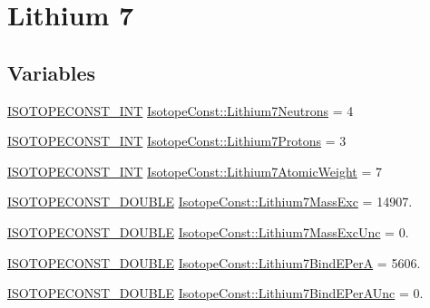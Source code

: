 \hypertarget{group___isotope_const-_lithium-_li7}{}\section{Lithium 7}
\label{group___isotope_const-_lithium-_li7}
\subsection*{Variables}
\begin{DoxyCompactItemize}
\item 
\mbox{\hyperlink{group___isotope_const-_macros_ga5f18360b3e99483a35c32d789e62621c}{I\+S\+O\+T\+O\+P\+E\+C\+O\+N\+S\+T\+\_\+\+I\+NT}} \mbox{\hyperlink{group___isotope_const-_lithium-_li7_gac860165049a504158d48f795525f3614}{Isotope\+Const\+::\+Lithium7\+Neutrons}} = 4
\item 
\mbox{\hyperlink{group___isotope_const-_macros_ga5f18360b3e99483a35c32d789e62621c}{I\+S\+O\+T\+O\+P\+E\+C\+O\+N\+S\+T\+\_\+\+I\+NT}} \mbox{\hyperlink{group___isotope_const-_lithium-_li7_gad05316718130babbb792839660df0ab0}{Isotope\+Const\+::\+Lithium7\+Protons}} = 3
\item 
\mbox{\hyperlink{group___isotope_const-_macros_ga5f18360b3e99483a35c32d789e62621c}{I\+S\+O\+T\+O\+P\+E\+C\+O\+N\+S\+T\+\_\+\+I\+NT}} \mbox{\hyperlink{group___isotope_const-_lithium-_li7_ga0995fe1d0399c786e44abe17c0c1f6d4}{Isotope\+Const\+::\+Lithium7\+Atomic\+Weight}} = 7
\item 
\mbox{\hyperlink{group___isotope_const-_macros_ga8f45a7272ce02c0b4c65c44636ed719a}{I\+S\+O\+T\+O\+P\+E\+C\+O\+N\+S\+T\+\_\+\+D\+O\+U\+B\+LE}} \mbox{\hyperlink{group___isotope_const-_lithium-_li7_ga85767bc8d5aaff5f153b03d00f550e73}{Isotope\+Const\+::\+Lithium7\+Mass\+Exc}} = 14907.
\item 
\mbox{\hyperlink{group___isotope_const-_macros_ga8f45a7272ce02c0b4c65c44636ed719a}{I\+S\+O\+T\+O\+P\+E\+C\+O\+N\+S\+T\+\_\+\+D\+O\+U\+B\+LE}} \mbox{\hyperlink{group___isotope_const-_lithium-_li7_ga8b9e6bbc08eccd42b2d64229ea2c32a5}{Isotope\+Const\+::\+Lithium7\+Mass\+Exc\+Unc}} = 0.
\item 
\mbox{\hyperlink{group___isotope_const-_macros_ga8f45a7272ce02c0b4c65c44636ed719a}{I\+S\+O\+T\+O\+P\+E\+C\+O\+N\+S\+T\+\_\+\+D\+O\+U\+B\+LE}} \mbox{\hyperlink{group___isotope_const-_lithium-_li7_ga146f8154e05852a8fba6b7f83e09829c}{Isotope\+Const\+::\+Lithium7\+Bind\+E\+PerA}} = 5606.
\item 
\mbox{\hyperlink{group___isotope_const-_macros_ga8f45a7272ce02c0b4c65c44636ed719a}{I\+S\+O\+T\+O\+P\+E\+C\+O\+N\+S\+T\+\_\+\+D\+O\+U\+B\+LE}} \mbox{\hyperlink{group___isotope_const-_lithium-_li7_gacbcb9689bbc3675c6150fa62f7458221}{Isotope\+Const\+::\+Lithium7\+Bind\+E\+Per\+A\+Unc}} = 0.

\end{DoxyCompactItemize}
